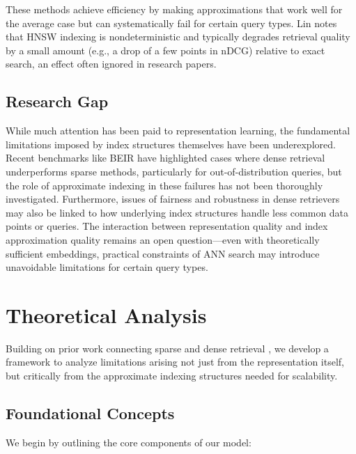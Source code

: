 \documentclass[conference,anonymous]{IEEEtran}
\begin{document}
These methods achieve efficiency by making approximations that work well for the average case but can systematically fail for certain query types. Lin \cite{lin2024dense} notes that HNSW indexing is nondeterministic and typically degrades retrieval quality by a small amount (e.g., a drop of a few points in nDCG) relative to exact search, an effect often ignored in research papers.

\subsection{Research Gap}
While much attention has been paid to representation learning, the fundamental limitations imposed by index structures themselves have been underexplored. Recent benchmarks like BEIR \cite{thakur2021beir} have highlighted cases where dense retrieval underperforms sparse methods, particularly for out-of-distribution queries, but the role of approximate indexing in these failures has not been thoroughly investigated. Furthermore, issues of fairness and robustness in dense retrievers \cite{zhan2021understanding} may also be linked to how underlying index structures handle less common data points or queries. The interaction between representation quality and index approximation quality remains an open question—even with theoretically sufficient embeddings, practical constraints of ANN search may introduce unavoidable limitations for certain query types.

\section{Theoretical Analysis}

Building on prior work connecting sparse and dense retrieval \cite{tay2020sparse}, we develop a framework to analyze limitations arising not just from the representation itself, but critically from the approximate indexing structures needed for scalability.

\subsection{Foundational Concepts}

We begin by outlining the core components of our model:
\end{document}
